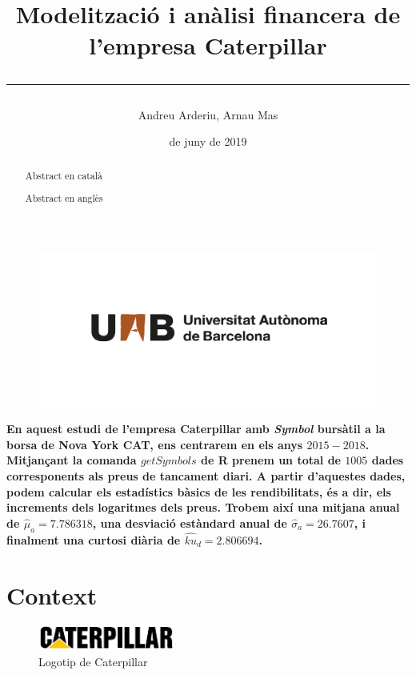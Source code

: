 \documentclass{article}
\title{\sffamily \bfseries Modelització i anàlisi financera de l'empresa Caterpillar \vspace{1em} \hrule}
\author{\sffamily Andreu Arderiu, Arnau Mas}
\date{\sffamily 14 de juny de 2019}
\numberwithin{table}{section}
\numberwithin{figure}{section}
\numberwithin{equation}{section}
\begin{document}
\begin{titlepage}
	\clearpage
	\thispagestyle{empty}
	\maketitle	

	\renewcommand{\abstractname}{\bfseries \sffamily Resum:}
	\begin{abstract}
		Abstract en català
	\end{abstract}

	\renewcommand{\abstractname}{\bfseries \sffamily Abstract:}
	\begin{abstract}
		Abstract en anglès
	\end{abstract}
	
	\begin{figure}[b]
		\thispagestyle{empty}
		\center \includegraphics[scale = 0.3]{uab}
	\end{figure}
\end{titlepage}

\textbf{En aquest estudi de l'empresa Caterpillar amb \textit{Symbol} bursàtil a la borsa de Nova York CAT, ens centrarem en els anys $2015-2018$. Mitjançant la comanda $getSymbols$ de R prenem un total de $1005$ dades corresponents als preus de tancament diari. A partir d'aquestes dades, podem calcular els estadístics bàsics de les rendibilitats, és a dir, els increments dels logaritmes dels preus. Trobem així una mitjana anual de $\hat{\mu}_a=7.786318$, una desviació estàndard anual de $\hat{\sigma}_a=26.7607$, i finalment una curtosi diària de $\hat{ku}_d=2.806694$. }

\section{Context}
\begin{figure}[htb]
	\centering \small \sffamily
	\includegraphics[width=0.4\textwidth]{cat-logo}
	\caption{Logotip de Caterpillar}
	\label{fig:logo}
\end{figure}
\end{document}
